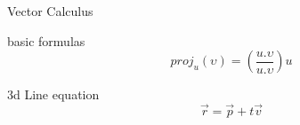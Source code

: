 \begin{section}{Vector Calculus}
	\begin{subsection}{basic formulas}
		$$proj_u ( \upsilon ) = \left( \frac{u . \upsilon}{u . \upsilon} \right) u $$

	\end{subsection}
	\begin{subsection}{3d Line equation}
		$$\vec{r} = \vec{p} + t \vec{v}$$
	\end{subsection}

\end{section}
